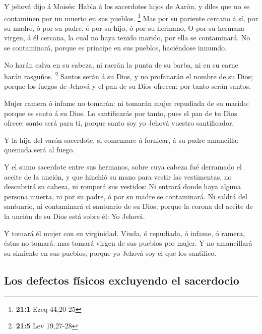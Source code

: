  Y jehová dijo á Moisés: Habla á los sacerdotes hijos de
Aarón, y diles que no se contaminen por un muerto en sus pueblos.
\footnote{\textbf{21:1} Ezeq 44,20-25}  Mas por su pariente
cercano á sí, por su madre, ó por su padre, ó por su hijo, ó por su
hermano,  O por su hermana virgen, á él cercana, la cual no
haya tenido marido, por ella se contaminará.  No se
contaminará, porque es príncipe en sus pueblos, haciéndose inmundo.

 No harán calva en su cabeza, ni raerán la punta de su
barba, ni en su carne harán rasguños. \footnote{\textbf{21:5} Lev
  19,27-28}  Santos serán á su Dios, y no profanarán el
nombre de su Dios; porque los fuegos de Jehová y el pan de su Dios
ofrecen: por tanto serán santos.

 Mujer ramera ó infame no tomarán: ni tomarán mujer
repudiada de su marido: porque es santo á su Dios.  Lo
santificarás por tanto, pues el pan de tu Dios ofrece: santo será para
ti, porque santo soy yo Jehová vuestro santificador.

 Y la hija del varón sacerdote, si comenzare á fornicar, á
su padre amancilla: quemada será al fuego.

 Y el sumo sacerdote entre sus hermanos, sobre cuya cabeza
fué derramado el aceite de la unción, y que hinchió su mano para vestir
las vestimentas, no descubrirá su cabeza, ni romperá sus vestidos:
 Ni entrará donde haya alguna persona muerta, ni por su
padre, ó por su madre se contaminará.  Ni saldrá del
santuario, ni contaminará el santuario de su Dios; porque la corona del
aceite de la unción de su Dios está sobre él: Yo Jehová.

 Y tomará él mujer con su virginidad.  Viuda,
ó repudiada, ó infame, ó ramera, éstas no tomará: mas tomará virgen de
sus pueblos por mujer.  Y no amancillará su simiente en sus
pueblos; porque yo Jehová soy el que los santifico.

\hypertarget{los-defectos-fuxedsicos-excluyendo-el-sacerdocio}{%
\subsection{Los defectos físicos excluyendo el
sacerdocio}\label{los-defectos-fuxedsicos-excluyendo-el-sacerdocio}}

